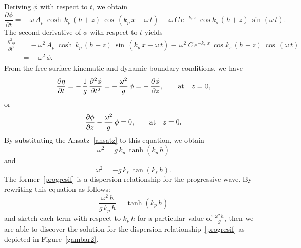 \documentclass[12pt,a4paper]{report}
\begin{document}
Deriving $\phi$ with respect to $t$, we obtain
\begin{equation}
\frac{\partial\phi}{\partial t} = -\, \omega \, A_{p} \: \cosh \, k_{p} \,(h + z) \: \cos \,(k_{p}\,x - \omega\, t) 
- \, \omega \, C \, e^{-k_{s}\,x} \: \cos k_{s}\,(h + z) \:\sin (\omega\, t).
\end{equation}
The second derivative of $\phi$ with respect to $t$ yields
\begin{align}
\frac{\partial^2 \phi}{\partial t^2} &= -\,\omega^2 \, A_{p} \: \cosh \,k_{p} \,(h + z) \: \sin \,(k_{p}\,x - \omega\, t)
- \, \omega^2 \, C \, e^{-k_{s}\,x} \: \cos k_{s} \, (h + z) \: \cos \, (\omega\, t) \nonumber \\
&= -\,\omega^2\,\phi.
\end{align}
From the free surface kinematic and dynamic boundary conditions, we have
\begin{equation}
\frac{\partial \eta}{\partial t} = -\,\frac{1}{g} \, \frac{\partial^2 \phi}{\partial t^2} = -\, \frac{\omega^2}{g}\,\phi = -\,\frac{\partial \phi}{\partial z}, \qquad \textmd{at} \quad z = 0,
\end{equation}
or
\begin{equation}
\frac{\partial \phi}{\partial z} - \frac{\omega^2}{g} \,\phi = 0, \qquad \textmd{at} \quad z = 0.
\end{equation}
By substituting the Ansatz~\eqref{ansatz} to this equation, we obtain
\begin{equation}
\omega^2 = g \, k_{p} \: \tanh \left(k_{p}\,h \right)	  \label{progresif}
\end{equation}
and
\begin{equation}
\omega^2 = -g \, k_{s} \: \tan \left(k_{s}\,h \right).  \label{berdiri}
\end{equation}
The former~\eqref{progresif} is a dispersion relationship for the progressive wave. By rewriting this equation as follows:
\begin{equation}
\frac{\omega^2\,h}{g\,k_{p}\,h} = \tanh \left(k_{p}\,h \right)
\end{equation}
and sketch each term with respect to $k_{p}\,h$ for a particular value of $\displaystyle \frac{\omega^2\,h}{g}$, then we are able to discover the solution for the dispersion relationship~\eqref{progresif} as depicted in Figure~\ref{gambar2}.
\end{document}
